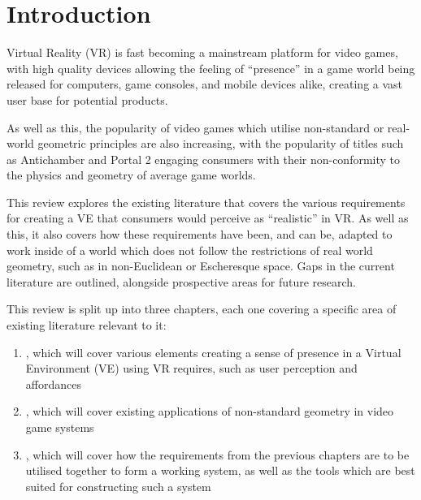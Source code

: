 \section{Introduction}
\label{lr:intro}
	
	Virtual Reality (VR) is fast becoming a mainstream platform for video games, with high quality devices allowing the feeling of \enquote{presence} in a game world being released for computers, game consoles, and mobile devices alike, creating a vast user base for potential products.

	As well as this, the popularity of video games which utilise non-standard or real-world geometric principles are also increasing, with the popularity of titles such as Antichamber \cite{Antichamber2013} and Portal 2 \cite{Portal22011} engaging consumers with their non-conformity to the physics and geometry of average game worlds.

	This review explores the existing literature that covers the various requirements for creating a VE that consumers would perceive as \enquote{realistic} in VR.
	As well as this, it also covers how these requirements have been, and can be, adapted to work inside of a world which does not follow the restrictions of real world geometry, such as in non-Euclidean or Escheresque space.
	Gaps in the current literature are outlined, alongside prospective areas for future research.

	This review is split up into three chapters, each one covering a specific area of existing literature relevant to it:
	\begin{enumerate}
		\item {}, which will cover various elements creating a sense of presence in a Virtual Environment (VE) using VR requires, such as user perception and affordances
		\item {}, which will cover existing applications of non-standard geometry in video game systems
		\item {}, which will cover how the requirements from the previous chapters are to be utilised together to form a working system, as well as the tools which are best suited for constructing such a system
	\end{enumerate}
